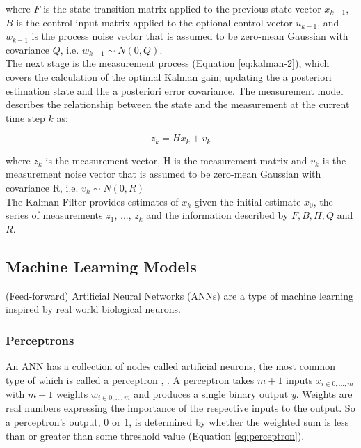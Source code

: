 where $F$ is the state transition matrix applied to the previous state vector $x_{k-1}$, $B$ is the control input matrix applied to the optional control vector $u_{k-1}$, and $w_{k-1}$ is the process noise vector that is assumed to be zero-mean Gaussian with covariance $Q$, i.e. $w_{k-1} \sim N(0, Q)$. \\

The next stage is the measurement process (Equation \ref{eq:kalman-2}), which covers the calculation of the optimal Kalman gain, updating the a posteriori estimation state and the a posteriori error covariance. The measurement model describes the relationship between the state and the measurement at the current time step $k$ as:

\begin{equation}
\label{eq:kalman-2}
    z_k = Hx_k + v_k
\end{equation}

where $z_k$ is the measurement vector, H is the measurement matrix and $v_k$ is the measurement noise vector that is assumed to be zero-mean Gaussian with covariance R, i.e. $v_k \sim N(0, R)$ \\

The Kalman Filter provides estimates of $x_k$ given the initial estimate $x_0$, the series of measurements $z_1$, ..., $z_k$ and the information described by $F, B, H, Q$ and $R$. \\

\subsection{Machine Learning Models}
\label{section:ml-models-research}

(Feed-forward) Artificial Neural Networks (ANNs) are a type of machine learning inspired by real world biological neurons. 

\subsubsection{Perceptrons}

An ANN has a collection of nodes called artificial neurons, the most common type of which is called a perceptron \cite{methods-for-ds-slides}, \cite{neural-networks-book}. A perceptron takes $m + 1$ inputs $x_{i\in{0,...,m}}$ with $m + 1$ weights $w_{i\in{0,...,m}}$ and produces a single binary output $y$. Weights are real numbers expressing the importance of the respective inputs to the output. So a perceptron's output, 0 or 1, is determined by whether the weighted sum is less than or greater than some threshold value (Equation \ref{eq:perceptron}).

